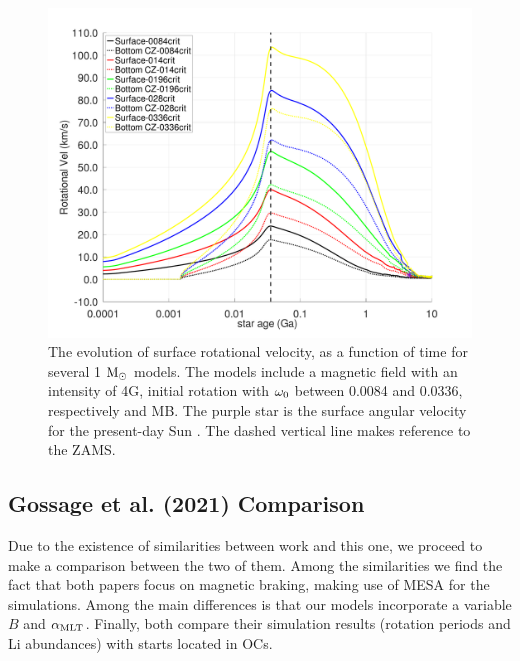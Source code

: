 \documentclass[fleqn,usenatbib]{mnras}
\begin{document}
\begin{figure}
	\includegraphics[clip,width=\columnwidth]{figures/paper2/rot_vel_var_vel_4_0g4.pdf}
    \caption{The evolution of surface rotational velocity, as a function of time for several 1 $\mathrm{M}_\odot$ models. The models include a magnetic field with an intensity of 4G, initial rotation with $\omega_{\mathrm{0}}$ between 0.0084 and 0.0336, respectively and MB. The purple star is the surface angular velocity for the present-day Sun \citep{Gill2012}. The dashed vertical line makes reference to the ZAMS.}
    \label{fig:rot_vel_var_vel_4_0g4}
\end{figure}



\subsection{Gossage et al. (2021) Comparison}
Due to the existence of similarities between \citet{Gossage2021} work and this one, we proceed to make a comparison between the two of them. Among the similarities we find the fact that both papers focus on magnetic braking, making use of MESA for the simulations. Among the main differences is that our models incorporate a variable $B$ and $\alpha_{\mathrm{MLT}}$. Finally, both compare their simulation results (rotation periods and Li abundances) with starts located in OCs.\par
\end{document}
